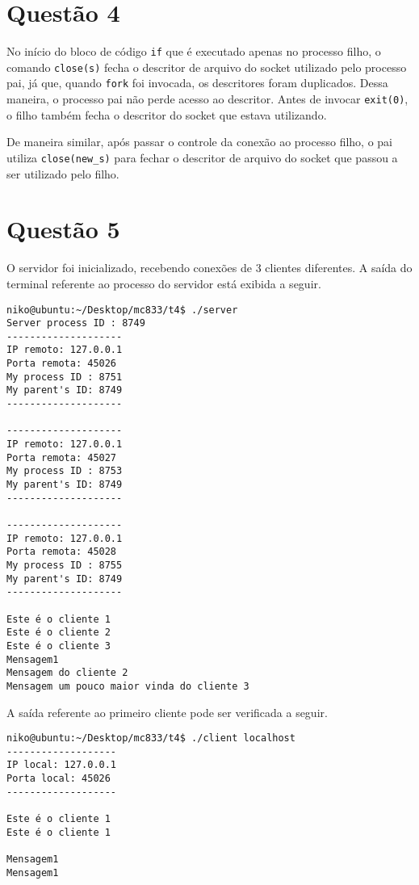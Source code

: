 \documentclass[a4paper,10pt]{article}
\begin{document}
\section{Questão 4}
No início do bloco de código {\tt if} que é executado apenas no processo filho, o comando {\tt close(s)} fecha o descritor de arquivo do socket utilizado pelo processo pai, já que, quando {\tt fork} foi invocada, os descritores foram duplicados. Dessa maneira, o processo pai não perde acesso ao descritor. Antes de invocar {\tt exit(0)}, o filho também fecha o descritor do socket que estava utilizando.

De maneira similar, após passar o controle da conexão ao processo filho, o pai utiliza {\tt close(new\_s)} para fechar o descritor de arquivo do socket que passou a ser utilizado pelo filho.

\section{Questão 5}
O servidor foi inicializado, recebendo conexões de 3 clientes diferentes. A saída do terminal referente ao processo do servidor está exibida a seguir.

\begin{lstlisting}
niko@ubuntu:~/Desktop/mc833/t4$ ./server 
Server process ID : 8749
--------------------
IP remoto: 127.0.0.1
Porta remota: 45026
My process ID : 8751
My parent's ID: 8749
--------------------

--------------------
IP remoto: 127.0.0.1
Porta remota: 45027
My process ID : 8753
My parent's ID: 8749
--------------------

--------------------
IP remoto: 127.0.0.1
Porta remota: 45028
My process ID : 8755
My parent's ID: 8749
--------------------

Este é o cliente 1
Este é o cliente 2
Este é o cliente 3
Mensagem1
Mensagem do cliente 2
Mensagem um pouco maior vinda do cliente 3

\end{lstlisting}

A saída referente ao primeiro cliente pode ser verificada a seguir.

\begin{lstlisting}
niko@ubuntu:~/Desktop/mc833/t4$ ./client localhost
-------------------
IP local: 127.0.0.1
Porta local: 45026
-------------------

Este é o cliente 1
Este é o cliente 1

Mensagem1
Mensagem1

\end{lstlisting}
\end{document}
